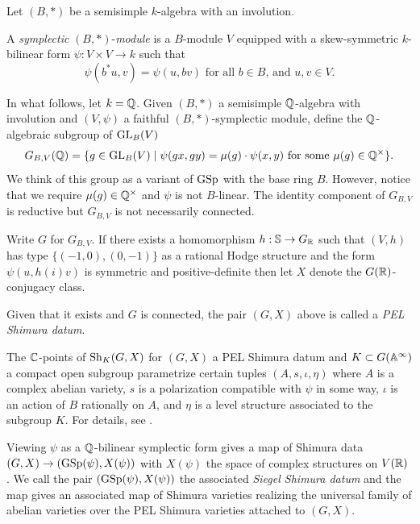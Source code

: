 \documentclass[main.tex]{subfiles}
\begin{document}
Let $(B, \ast)$ be a semisimple $k$-algebra with an involution.

\begin{defn}
A \textit{symplectic} $(B, \ast)$-\textit{module} is a $B$-module $V$ equipped with a skew-symmetric $k$-bilinear form $\psi : V \times V \to k$ such that
\[ \psi(b^* u, v) = \psi(u, bv) \text{ for all } b \in B \text{, and } u,v \in V. \]
\end{defn}
In what follows, let $k = \mathbb{Q}$. Given $(B, \ast)$ a semisimple $\mathbb{Q}$-algebra with involution and $(V, \psi)$ a faithful $(B, \ast)$-symplectic module, define the $\mathbb{Q}$-algebraic subgroup of $\mathrm{GL}_B(V)$
\[ G_{B,V}(\mathbb{Q}) = \{ g \in \mathrm{GL}_B(V) \mid \psi(gx, gy) = \mu(g) \cdot \psi(x,y) \text{ for some } \mu(g) \in \mathbb{Q}^\times \}. \]
We think of this group as a variant of $\mathrm{GSp}$ with the base ring $B$. However, notice that we require $\mu(g) \in \mathbb{Q}^\times$ and $\psi$ is not $B$-linear. The identity component of $G_{B,V}$ is reductive but $G_{B,V}$ is not necessarily connected. 
\par 
Write $G$ for $G_{B,V}$.
If there exists a homomorphism $h : \mathbb{S} \to G_{\mathbb{R}}$ such that $(V,h)$ has type $\{ (-1,0), (0,-1) \}$ as a rational Hodge structure and the form $\psi(u, h(i) v)$ is symmetric and positive-definite then let $X$ denote the $G(\mathbb{R})$-conjugacy class.

\begin{defn}
Given that it exists and $G$ is connected, the pair $(G, X)$ above is called a \textit{PEL Shimura datum}. 
\end{defn}

The $\mathbb{C}$-points of $\mathrm{Sh}_K(G,X)$ for $(G,X)$ a PEL Shimura datum and $K \subset G(\mathbb{A}^{\infty})$ a compact open subgroup parametrize certain tuples $(A, s, \iota, \eta)$ where $A$ is a complex abelian variety, $s$ is a polarization compatible with $\psi$ in some way, $\iota$ is an action of $B$ rationally on $A$, and $\eta$ is a level structure associated to the subgroup $K$. For details, see \cite[Chapter 8]{milne:shimura_varieties}.
\par
Viewing $\psi$ as a $\mathbb{Q}$-bilinear symplectic form gives a map of Shimura data $(G,X) \to (\mathrm{GSp}(\psi), X(\psi))$ with $X(\psi)$ the space of complex structures on $V(\mathbb{R})$ \cite[p.69]{milne:shimura_varieties}. We call the pair $(\mathrm{GSp}(\psi), X(\psi))$ the associated \textit{Siegel Shimura datum} and the map gives an associated map of Shimura varieties realizing the universal family of abelian varieties over the PEL Shimura varieties attached to $(G, X)$.
\end{document}
